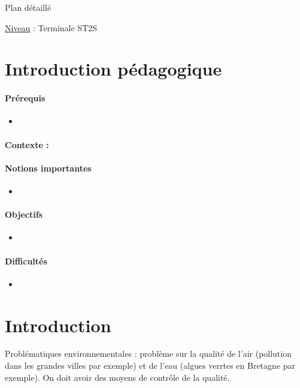 \begin{reportBlock}{Plan détaillé}

\underline{Niveau} : Terminale ST2S \\

\section*{Introduction pédagogique}


\paragraph*{Prérequis}
\begin{itemize}
\item
\end{itemize}
\paragraph*{Contexte :}


\paragraph*{Notions importantes}

\begin{itemize}
\item 
\end{itemize}

\paragraph*{Objectifs}

\begin{itemize}
\item 
\end{itemize}

\paragraph*{Difficultés}

\begin{itemize}
\item 
\end{itemize}


\section*{Introduction }
Problématiques environnementales : problème sur la qualité de l'air (pollution dans les grandes villes par exemple) et de l'eau (algues verrtes en Bretagne par exemple). On doit avoir des moyens de contrôle de la qualité.


\end{reportBlock}
